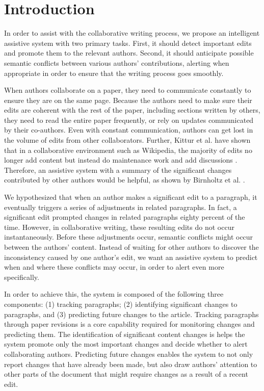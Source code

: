 \section{Introduction}\label{introduction}

In order to assist with the collaborative writing process, we propose an
intelligent assistive system with two primary tasks. First, it should
detect important edits and promote them to the relevant authors. Second,
it should anticipate possible semantic conflicts between various
authors' contributions, alerting when appropriate in order to ensure
that the writing process goes smoothly.

When authors collaborate on a paper, they need to communicate constantly
to ensure they are on the same page. Because the authors need to make
sure their edits are coherent with the rest of the paper, including
sections written by others, they need to read the entire paper
frequently, or rely on updates communicated by their co-authors. Even
with constant communication, authors can get lost in the volume of edits
from other collaborators. Further, Kittur et al. have shown that in a
collaborative environment such as Wikipedia, the majority of edits no
longer add content but instead do maintenance work and add discussions
\cite{kittur2007he}. Therefore, an assistive system with a summary of
the significant changes contributed by other authors would be helpful,
as shown by Birnholtz et al. \cite{birnholtz2012tracking}.

We hypothesized that when an author makes a significant edit to a
paragraph, it eventually triggers a series of adjustments in related
paragraphs. In fact, a significant edit prompted changes in related
paragraphs eighty percent of the time. However, in collaborative
writing, these resulting edits do not occur instantaneously. Before
these adjustments occur, semantic conflicts might occur between the
authors' content. Instead of waiting for other authors to discover the
inconsistency caused by one author's edit, we want an assistive system
to predict when and where these conflicts may occur, in order to alert
even more specifically.

In order to achieve this, the system is composed of the following three
components: (1) tracking paragraphs; (2) identifying significant changes
to paragraphs, and (3) predicting future changes to the article.
Tracking paragraphs through paper revisions is a core capability
required for monitoring changes and predicting them. The identification
of significant content changes is helps the system promote only the most
important changes and decide whether to alert collaborating authors.
Predicting future changes enables the system to not only report changes
that have already been made, but also draw authors' attention to other
parts of the document that might require changes as a result of a recent
edit.

